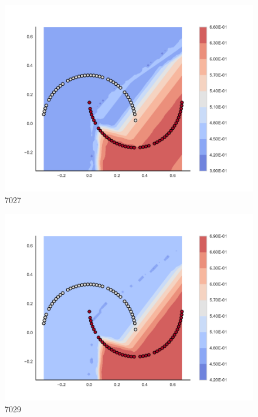 \begin{subfigure}[b]{0.09\textwidth}
    \includegraphics[clip, trim=2.35cm 1.75cm 4.5cm 0cm,width=\textwidth]{img/convergence/7027.pdf}
    \caption{7027}
    \label{fig:convergence_7027}
\end{subfigure}
%
\begin{subfigure}[b]{0.09\textwidth}
    \includegraphics[clip, trim=2.35cm 1.75cm 4.5cm 0cm,width=\textwidth]{img/convergence/7029.pdf}
    \caption{7029}
    \label{fig:convergence_7029}
\end{subfigure}
%
